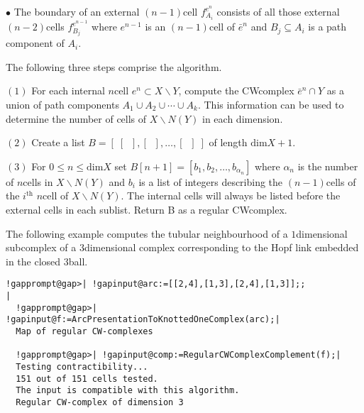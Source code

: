 \documentclass[a4paper,11pt]{report}
\begin{document}
{{$\bullet$ The boundary of an external $(n-1)$\texttt{}cell $f^{e^n}_{A_i}$ consists of all those external $(n-2)$\texttt{}cells $f^{e^{n-1}}_{B_j}$ where $e^{n-1}$ is an $(n-1)$\texttt{}cell of $\bar{e}^n$ and $B_j \subseteq A_i$ is a path component of $A_i$. 

The following three steps comprise the algorithm. 

$(1)$ For each internal $n$\texttt{}cell $e^n \subset X \backslash Y$, compute the CW\texttt{}complex $\bar{e}^n \cap Y$ as a union of path components $A_1 \cup A_2 \cup \cdots \cup A_k$. This information can be used to determine the number of cells of $X \backslash N(Y)$ in each dimension. 

$(2)$ Create a list $B=[ \; [ \; \; ], [ \; \; ], \ldots, [ \; \; ] \; ]$ of length $\textrm{dim}X +1$. 

$(3)$ For $0 \leq n \leq \textrm{dim}X$ set $B[n+1]=[ b_1, b_2, \ldots, b_{\alpha_n} ]$ where $\alpha_n$ is the number of $n$\texttt{}cells in $X \backslash N(Y)$ and $b_i$ is a list of integers describing the $(n-1)$\texttt{}cells of the $i ^ \textrm{th}$ $n$\texttt{}cell of $X \backslash N(Y)$. The internal cells will always be listed before the external cells in each
sublist. Return B as a regular CW\texttt{}complex. 

 The following example computes the tubular neighbourhood of a $1$\texttt{}dimensional subcomplex of a $3$\texttt{}dimensional complex corresponding to the Hopf link
embedded in the closed $3$\texttt{}ball. 
\begin{Verbatim}[commandchars=!@|,fontsize=\small,frame=single,label=Example]
  !gapprompt@gap>| !gapinput@arc:=[[2,4],[1,3],[2,4],[1,3]];;            |
  !gapprompt@gap>| !gapinput@f:=ArcPresentationToKnottedOneComplex(arc);|
  Map of regular CW-complexes
  
  !gapprompt@gap>| !gapinput@comp:=RegularCWComplexComplement(f);|
  Testing contractibility...
  151 out of 151 cells tested.
  The input is compatible with this algorithm.
  Regular CW-complex of dimension 3
  

\end{Verbatim}}}
\end{document}
